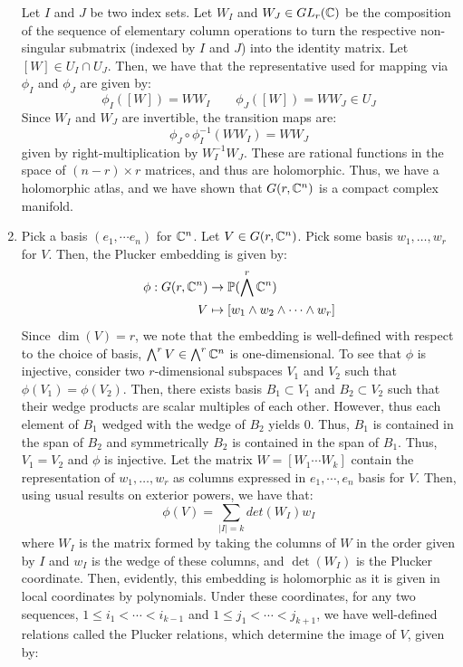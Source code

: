 \documentclass[12pt]{article}
\begin{document}
\begin{solution}
\begin{enumerate}
        Let $I$ and $J$ be two index sets. Let $W_I$ and $W_J \in GL_r(\mathbb C)$ be the composition of the sequence of elementary column operations to turn the respective non-singular submatrix (indexed by $I$ and $J$) into the identity matrix. Let $[W] \in U_I \cap U_J$. Then, we have that the representative used for mapping via $\phi_I$ and $\phi_J$ are given by:
        \[ \phi_I([W]) = WW_I \qquad \phi_J([W]) = WW_J \in U_J\]
        Since $W_I$ and $W_J$ are invertible, the transition maps are:
        \[ \phi_J \circ \phi_I^{-1}(WW_I) = WW_J \]
        given by right-multiplication by $W_I^{-1}W_J$. These are rational functions in the space of $(n-r) \times r$ matrices, and thus are holomorphic. Thus, we have a holomorphic atlas, and we have shown that $G(r, \mathbb C^n)$ is a compact complex manifold.
        \item Pick a basis $(e_1, \cdots e_n)$ for $\mathbb C^n$. Let $V \in G(r, \mathbb C^n)$. Pick some basis $w_1, \ldots, w_r$ for $V$. Then, the Plucker embedding is given by: 
        \begin{align*}
            \phi: G(r, \mathbb C^n) &\to \mathbb{P}(\bigwedge^r \mathbb C^n) \\
            V &\mapsto [w_1 \wedge w_2 \wedge \cdots \wedge w_r]
        \end{align*}
        Since $\dim(V) = r$, we note that the embedding is well-defined with respect to the choice of basis, $\bigwedge^r V \in \bigwedge^r \mathbb C^n$ is one-dimensional. \bbni
        To see that $\phi$ is injective, consider two $r$-dimensional subspaces $V_1$ and $V_2$ such that $\phi(V_1) = \phi(V_2)$. Then, there exists basis $B_1 \subset V_1$ and $B_2 \subset V_2$ such that their wedge products are scalar multiples of each other. However, thus each element of $B_1$ wedged with the wedge of $B_2$ yields $0$. Thus, $B_1$ is contained in the span of $B_2$ and symmetrically $B_2$ is contained in the span of $B_1$. Thus, $V_1 = V_2$ and $\phi$ is injective. \bbni
        Let the matrix $W = [W_1 \cdots W_k]$ contain the representation of $w_1, \ldots, w_r$ as columns expressed in $e_1, \cdots, e_n$ basis for $V$. Then, using usual results on exterior powers, we have that:
        \[ \phi(V) = \sum_{|I| = k} det(W_I) w_I\]
        where $W_I$ is the matrix formed by taking the columns of $W$ in the order given by $I$ and $w_I$ is the wedge of these columns, and $\det(W_I)$ is the Plucker coordinate. Then, evidently, this embedding is holomorphic as it is given in local coordinates by polynomials.  \bbni
        Under these coordinates, for any two sequences, $1 \leq i_1 < \cdots < i_{k-1}$ and $1 \leq j_1 < \cdots < j_{k+1}$, we have well-defined relations called the Plucker relations, which determine the image of $V$, given by:

\end{enumerate}
\end{solution}
\end{document}
